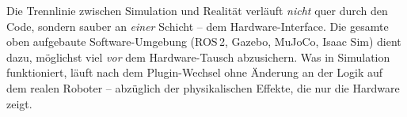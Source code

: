 \begin{infobox}[title=Was an dieser Reihenfolge entscheidend ist]
Die Trennlinie zwischen Simulation und Realität verläuft \emph{nicht} quer durch
den Code, sondern sauber an \emph{einer} Schicht -- dem Hardware-Interface. Die
gesamte oben aufgebaute Software-Umgebung (ROS\,2, Gazebo, MuJoCo, Isaac Sim)
dient dazu, möglichst viel \emph{vor} dem Hardware-Tausch abzusichern. Was in
Simulation funktioniert, läuft nach dem Plugin-Wechsel ohne Änderung an der
Logik auf dem realen Roboter -- abzüglich der physikalischen Effekte, die nur
die Hardware zeigt.
\end{infobox}
